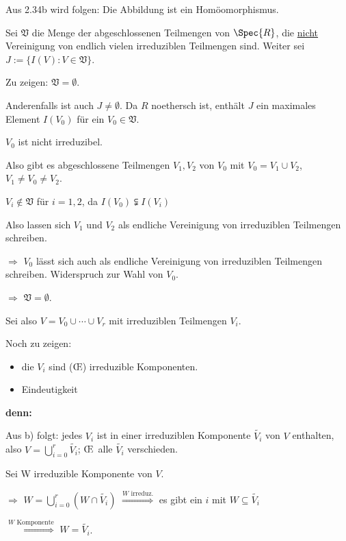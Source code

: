 \begin{DefProp}
\begin{Bew}
\begin{enumerate}
Aus 2.34b wird folgen: Die Abbildung ist ein Hom\"oomorphismus.

Sei $\mathfrak{V}$ die Menge der abgeschlossenen Teilmengen von $\Spec{R}$, die
\underline{nicht} Vereinigung von endlich vielen irreduziblen Teilmengen sind.
Weiter sei $J := \{ I(V) : V \in \mathfrak{V} \}$.

Zu zeigen: $\mathfrak{V} = \emptyset$.

Anderenfalls ist auch $J \neq \emptyset$. Da $R$ noethersch ist, enth\"alt $J$ ein maximales Element $I(V_0)$ f\"ur ein $V_0 \in \mathfrak{V}$.

$V_0$ ist nicht irreduzibel.

Also gibt es abgeschlossene Teilmengen $V_1, V_2$ von $V_0$ mit $V_0 = V_1 \cup V_2$, $V_1 \neq V_0 \neq V_2$.

$V_i \notin \mathfrak{V}$ f\"ur $i = 1,2$, da $I(V_0) \subsetneqq I(V_i)$

Also lassen sich $V_1$ und $V_2$ als endliche Vereinigung von irreduziblen Teilmengen schreiben.

$\Rightarrow$ $V_0$ l\"asst sich auch als endliche Vereinigung von irreduziblen Teilmengen schreiben. Widerspruch zur Wahl von $V_0$.

$\Rightarrow$ $\mathfrak{V} = \emptyset$.
\bigskip

Sei also $V = V_0 \cup \cdots \cup V_r$ mit irreduziblen Teilmengen $V_i$.

Noch zu zeigen: 
\begin{itemize}
\item die $V_i$ sind (\OE) irreduzible Komponenten.
\item Eindeutigkeit
\end{itemize}

\textbf{denn:}

Aus b) folgt: jedes $V_i$ ist in einer irreduziblen Komponente
$\widetilde{V_i}$ von $V$ enthalten, also $V = \bigcup_{i=0}^r
\widetilde{V_i}$; \OE\ alle $\widetilde{V_i}$ verschieden.

Sei W irreduzible Komponente von $V$.

$\Rightarrow$ $W = \bigcup_{i=0}^r (W \cap \widetilde{V_i})$ $\overset{W \text{ irreduz.}}\Rightarrow$ es gibt ein $i$ mit $W \subseteq \widetilde{V_i}$

$\overset{W \text{ Komponente}}\Rightarrow$ $W = \widetilde{V_i}$.

\end{enumerate}
\end{Bew}

\end{DefProp}

